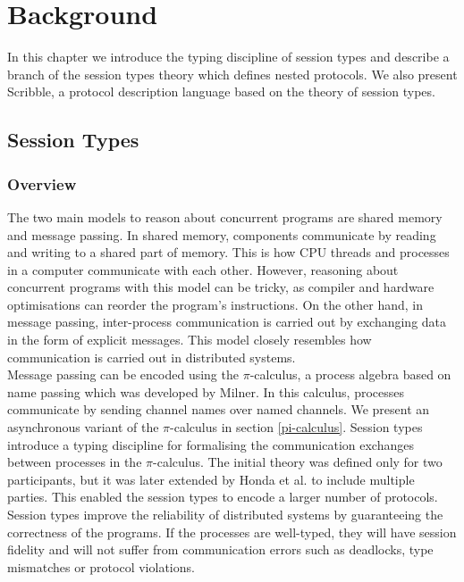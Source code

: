 \documentclass[12pt,twoside]{report}
\begin{document}

\chapter{Background}\label{background}

In this chapter we introduce the typing discipline of session types and describe a branch of the session types theory which defines nested protocols. We also present Scribble\cite{scribble}, a protocol description language based on the theory of session types.

\section{Session Types}
\subsection{Overview}

The two main models to reason about concurrent programs are shared memory and message passing. In shared memory, components communicate by reading and writing to a shared part of memory. This is how CPU threads and processes in a computer communicate with each other. However, reasoning about concurrent programs with this model can be tricky, as compiler and hardware optimisations can reorder the program's instructions\cite{sharedmemory}. On the other hand, in message passing, inter-process communication is carried out by exchanging data in the form of explicit messages. This model closely resembles how communication is carried out in distributed systems.\\

Message passing can be encoded using the $\pi$-calculus, a process algebra based on name passing which was developed by Milner\cite{milnerpicalc}. In this calculus, processes communicate by sending channel names over named channels. We present an asynchronous variant of the $\pi$-calculus in section \ref{pi-calculus}. Session types\cite{binarysessiontypes1} introduce a typing discipline for formalising the communication exchanges between processes in the $\pi$-calculus. The initial theory was defined only for two participants, but it was later extended by Honda et al.\cite{asyncmpst1, asyncmpst2} to include multiple parties. This enabled the session types to encode a larger number of protocols. Session types improve the reliability of distributed systems by guaranteeing the correctness of the programs. If the processes are well-typed, they will have session fidelity and will not suffer from communication errors such as deadlocks, type mismatches or protocol violations.\\
\end{document}
